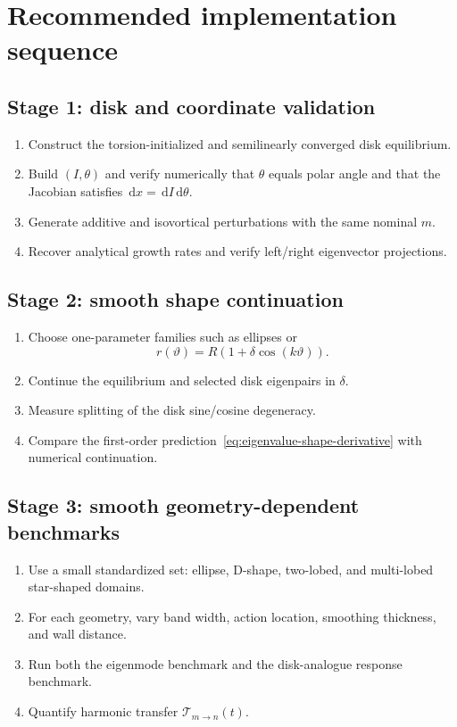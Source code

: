 \documentclass[11pt,a4paper]{article}
\newcommand{\dd}{\,\mathrm{d}}
\begin{document}
\section{Recommended implementation sequence}

\subsection*{Stage 1: disk and coordinate validation}
\begin{enumerate}
  \item Construct the torsion-initialized and semilinearly converged disk equilibrium.
  \item Build $(I,\theta)$ and verify numerically that $\theta$ equals polar angle and that the Jacobian satisfies $\dd x=\dd I\dd\theta$.
  \item Generate additive and isovortical perturbations with the same nominal $m$.
  \item Recover analytical growth rates and verify left/right eigenvector projections.
\end{enumerate}

\subsection*{Stage 2: smooth shape continuation}
\begin{enumerate}
  \item Choose one-parameter families such as ellipses or
  \[
    r(\vartheta)=R\left(1+\delta\cos(k\vartheta)\right).
  \]
  \item Continue the equilibrium and selected disk eigenpairs in $\delta$.
  \item Measure splitting of the disk sine/cosine degeneracy.
  \item Compare the first-order prediction~\eqref{eq:eigenvalue-shape-derivative} with numerical continuation.
\end{enumerate}

\subsection*{Stage 3: smooth geometry-dependent benchmarks}
\begin{enumerate}
  \item Use a small standardized set: ellipse, D-shape, two-lobed, and multi-lobed star-shaped domains.
  \item For each geometry, vary band width, action location, smoothing thickness, and wall distance.
  \item Run both the eigenmode benchmark and the disk-analogue response benchmark.
  \item Quantify harmonic transfer $\mathcal{T}_{m\to n}(t)$.
\end{enumerate}
\end{document}
